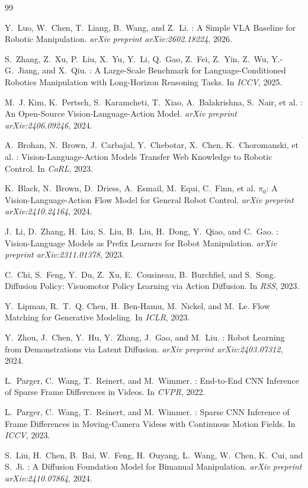\documentclass[10pt,twocolumn]{article}
\begin{document}
\begin{thebibliography}{99}

Y.~Luo, W.~Chen, T.~Liang, B.~Wang, and Z.~Li.
: A Simple VLA Baseline for Robotic Manipulation.
\newblock \textit{arXiv preprint arXiv:2602.18224}, 2026.

S.~Zhang, Z.~Xu, P.~Liu, X.~Yu, Y.~Li, Q.~Gao, Z.~Fei, Z.~Yin, Z.~Wu, Y.-G.~Jiang, and X.~Qiu.
: A Large-Scale Benchmark for Language-Conditioned Robotics Manipulation with Long-Horizon Reasoning Tasks.
\newblock In \textit{ICCV}, 2025.

M.~J. Kim, K.~Pertsch, S.~Karamcheti, T.~Xiao, A.~Balakrishna, S.~Nair, et al.
: An Open-Source Vision-Language-Action Model.
\newblock \textit{arXiv preprint arXiv:2406.09246}, 2024.

A.~Brohan, N.~Brown, J.~Carbajal, Y.~Chebotar, X.~Chen, K.~Choromanski, et al.
: Vision-Language-Action Models Transfer Web Knowledge to Robotic Control.
\newblock In \textit{CoRL}, 2023.

K.~Black, N.~Brown, D.~Driess, A.~Esmail, M.~Equi, C.~Finn, et al.
\newblock $\pi_0$: A Vision-Language-Action Flow Model for General Robot Control.
\newblock \textit{arXiv preprint arXiv:2410.24164}, 2024.

J.~Li, D.~Zhang, H.~Liu, S.~Liu, B.~Liu, H.~Dong, Y.~Qiao, and C.~Gao.
: Vision-Language Models as Prefix Learners for Robot Manipulation.
\newblock \textit{arXiv preprint arXiv:2311.01378}, 2023.

C.~Chi, S.~Feng, Y.~Du, Z.~Xu, E.~Cousineau, B.~Burchfiel, and S.~Song.
\newblock Diffusion Policy: Visuomotor Policy Learning via Action Diffusion.
\newblock In \textit{RSS}, 2023.

Y.~Lipman, R.~T.~Q. Chen, H.~Ben-Hamu, M.~Nickel, and M.~Le.
\newblock Flow Matching for Generative Modeling.
\newblock In \textit{ICLR}, 2023.

Y.~Zhou, J.~Chen, Y.~Hu, Y.~Zhang, J.~Gao, and M.~Liu.
: Robot Learning from Demonstrations via Latent Diffusion.
\newblock \textit{arXiv preprint arXiv:2403.07312}, 2024.

L.~Parger, C.~Wang, T.~Reinert, and M.~Wimmer.
: End-to-End CNN Inference of Sparse Frame Differences in Videos.
\newblock In \textit{CVPR}, 2022.

L.~Parger, C.~Wang, T.~Reinert, and M.~Wimmer.
: Sparse CNN Inference of Frame Differences in Moving-Camera Videos with Continuous Motion Fields.
\newblock In \textit{ICCV}, 2023.

S.~Liu, H.~Chen, B.~Bai, W.~Feng, H.~Ouyang, L.~Wang, W.~Chen, K.~Cui, and S.~Ji.
: A Diffusion Foundation Model for Bimanual Manipulation.
\newblock \textit{arXiv preprint arXiv:2410.07864}, 2024.

\end{thebibliography}
\end{document}
